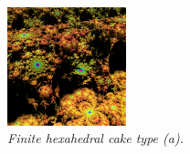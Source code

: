 \documentclass[suppldata, dvipdfmx]{interact}
\theoremstyle{plain}%
\theoremstyle{definition}
\theoremstyle{remark}
\theoremstyle{problemstyle}
\begin{document}
\begin{figure}[H]
\begin{minipage}{0.5\textwidth}
  \begin{minipage}[t]{0.24\textwidth}
   \centering
   \includegraphics[width=1.35in, height=1.35in,
   keepaspectratio]{./img/sphairahedron/hexahedralCake3/limitsetInf_a.png} 
  \end{minipage}
  \hspace*{\fill}
  \caption{\textit{Finite hexahedral cake type (a).}}
  \label{}
 \end{minipage}
\end{figure}
\end{document}
